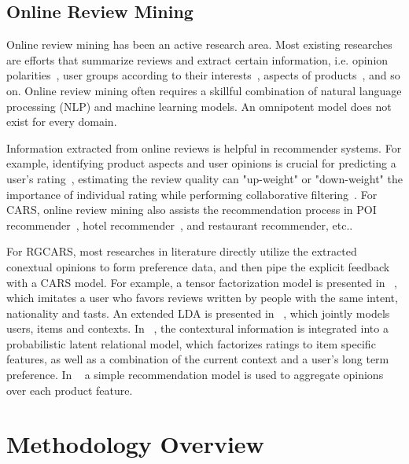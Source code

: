 \documentclass[preprint,12pt]{elsarticle}
\begin{document}
\subsection{Online Review Mining}

Online review  mining has been an active research area. Most existing researches are efforts that summarize reviews and extract certain information, i.e. opinion polarities~\cite{Liu2005Opinion}, user groups according to their interests~\cite{Si2014Users}, aspects of products~\cite{Moghaddam2013FLDA}, and so on. Online review mining often requires a skillful combination of natural language processing (NLP) and machine learning models. An omnipotent model does not exist for every domain.


Information extracted from online reviews is helpful in recommender systems. For example, identifying product aspects and user opinions is crucial for predicting a user's rating~\cite{Qu2010Bag}, estimating the review quality can "up-weight" or "down-weight" the importance of individual rating while performing collaborative filtering~\cite{Raghavan2012Review}. For CARS, online review mining also assists the recommendation process in POI recommender~\cite{Biancalana2013Approach}, hotel recommender~\cite{Levi2012Finding}, and restaurant recommender\cite{Li2010Contextual}, etc..


For RGCARS, most researches in literature directly utilize the extracted conextual opinions to form preference data, and then pipe the explicit feedback with a CARS model. For example, a tensor factorization model is presented in ~\cite{Levi2012Finding}, which imitates a user who favors reviews written by people with the same intent, nationality and tasts.  An extended LDA is presented in ~\cite{Hariri2013Query}, which jointly models users, items and contexts. In ~\cite{Li2010Contextual}, the contextural information is integrated into a probabilistic latent relational model, which factorizes ratings to item specific features, as well as a combination of the current context and a user's long term preference. In ~\cite{Liu2013Combining} a simple recommendation model is used to aggregate opinions over each product feature. 

\section{Methodology Overview}\label{sec:method}
\end{document}
